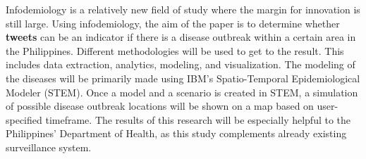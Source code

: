 \begin{thesisabstract}

Infodemiology is a relatively new field of study where the margin for innovation is still large. Using infodemiology, the aim of the paper is to determine whether \textbf{tweets} can be an indicator if there is a disease outbreak within a certain area in the Philippines. Different methodologies will be used to get to the result. This includes data extraction, analytics, modeling, and visualization. The modeling of the diseases will be primarily made using IBM's Spatio-Temporal Epidemiological Modeler (STEM). Once a model and a scenario is created in STEM, a simulation of possible disease outbreak locations will be shown on a map based on user-specified timeframe. The results of this research will be especially helpful to the Philippines' Department of Health, as this study complements already existing surveillance system.

\end{thesisabstract}